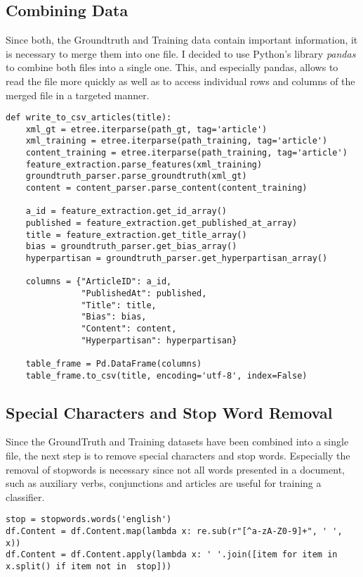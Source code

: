 \documentclass[a4paper, 11pt,titlepage,oneside,openany]{book}
\begin{document}
\subsection{Combining Data}
Since both, the Groundtruth and Training data contain important information, it is necessary to merge them into one file. I decided to use Python's library \textit{pandas} \cite{pandas} to combine both files into a single one. This, and especially pandas, allows to read the file more quickly as well as to access individual rows and columns of the merged file in a targeted manner.
\begin{lstlisting}[caption=Merge GroundTruth and Training datasets]
def write_to_csv_articles(title):
    xml_gt = etree.iterparse(path_gt, tag='article')
    xml_training = etree.iterparse(path_training, tag='article')
    content_training = etree.iterparse(path_training, tag='article')
    feature_extraction.parse_features(xml_training)
    groundtruth_parser.parse_groundtruth(xml_gt)
    content = content_parser.parse_content(content_training)

    a_id = feature_extraction.get_id_array()
    published = feature_extraction.get_published_at_array)
    title = feature_extraction.get_title_array()
    bias = groundtruth_parser.get_bias_array()
    hyperpartisan = groundtruth_parser.get_hyperpartisan_array()

    columns = {"ArticleID": a_id,
               "PublishedAt": published,
               "Title": title,
               "Bias": bias,
               "Content": content,
               "Hyperpartisan": hyperpartisan}

    table_frame = Pd.DataFrame(columns)
    table_frame.to_csv(title, encoding='utf-8', index=False)
\end{lstlisting}


\subsection{Special Characters and Stop Word Removal}
Since the GroundTruth and Training datasets have been combined into a single file, the next step  is to remove special characters and stop words. Especially the removal of stopwords is necessary since not all words presented in a document, such as auxiliary verbs, conjunctions and articles \cite{textclassification} are useful for training a classifier.
\begin{lstlisting}[caption=Special Characters and Stop Word Removal]
stop = stopwords.words('english')
df.Content = df.Content.map(lambda x: re.sub(r"[^a-zA-Z0-9]+", ' ', x))
df.Content = df.Content.apply(lambda x: ' '.join([item for item in x.split() if item not in  stop]))
\end{lstlisting}
\end{document}

